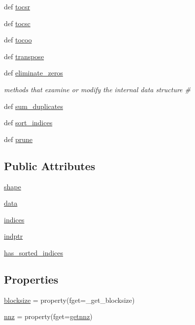 \begin{DoxyCompactItemize}
def \hyperlink{classscipy_1_1sparse_1_1bsr_1_1bsr__matrix_a448b55d9357ddc577fccd35c4642f05d}{tocsr}
\item 
def \hyperlink{classscipy_1_1sparse_1_1bsr_1_1bsr__matrix_a40a3717181e1d6cc56041f1a55b93d72}{tocsc}
\item 
def \hyperlink{classscipy_1_1sparse_1_1bsr_1_1bsr__matrix_a7b14a9a89a87a50cfdb657a111c67531}{tocoo}
\item 
def \hyperlink{classscipy_1_1sparse_1_1bsr_1_1bsr__matrix_afce653797f6a35b46a242ba046b0ce1c}{transpose}
\item 
def \hyperlink{classscipy_1_1sparse_1_1bsr_1_1bsr__matrix_acee88e6d3ec93bb54ada4ba2ed21c369}{eliminate\+\_\+zeros}
\begin{DoxyCompactList}\small\item\em methods that examine or modify the internal data structure \# \end{DoxyCompactList}\item 
def \hyperlink{classscipy_1_1sparse_1_1bsr_1_1bsr__matrix_aa7295d97963296dc1b95029c18117a01}{sum\+\_\+duplicates}
\item 
def \hyperlink{classscipy_1_1sparse_1_1bsr_1_1bsr__matrix_a516a25c42177fd01361f18f9750fc124}{sort\+\_\+indices}
\item 
def \hyperlink{classscipy_1_1sparse_1_1bsr_1_1bsr__matrix_a67cf967178089b8e614ebbc6599066e5}{prune}
\end{DoxyCompactItemize}
\subsection*{Public Attributes}
\begin{DoxyCompactItemize}
\item 
\hyperlink{classscipy_1_1sparse_1_1bsr_1_1bsr__matrix_a615ecc11e3035c491cd642274c5903c7}{shape}
\item 
\hyperlink{classscipy_1_1sparse_1_1bsr_1_1bsr__matrix_ad45553d979b511f0dcd94aa692c248ee}{data}
\item 
\hyperlink{classscipy_1_1sparse_1_1bsr_1_1bsr__matrix_aa4f3e6455ec7835522288c7a014272e1}{indices}
\item 
\hyperlink{classscipy_1_1sparse_1_1bsr_1_1bsr__matrix_a905b9c8e5abbe3ca1d2667a92eeab14a}{indptr}
\item 
\hyperlink{classscipy_1_1sparse_1_1bsr_1_1bsr__matrix_aa3ea5c882675f7ec5f79a8144367438b}{has\+\_\+sorted\+\_\+indices}
\end{DoxyCompactItemize}
\subsection*{Properties}
\begin{DoxyCompactItemize}
\item 
\hyperlink{classscipy_1_1sparse_1_1bsr_1_1bsr__matrix_a7acef51437e1b95609b71de68fe18ae1}{blocksize} = property(fget=\+\_\+get\+\_\+blocksize)
\item 
\hyperlink{classscipy_1_1sparse_1_1bsr_1_1bsr__matrix_a0d58d398fe0ee3cf29ee8e893947025d}{nnz} = property(fget=\hyperlink{classscipy_1_1sparse_1_1bsr_1_1bsr__matrix_a9ba0aebea1da2d711704b42e9a7d64d2}{getnnz})
\end{DoxyCompactItemize}


